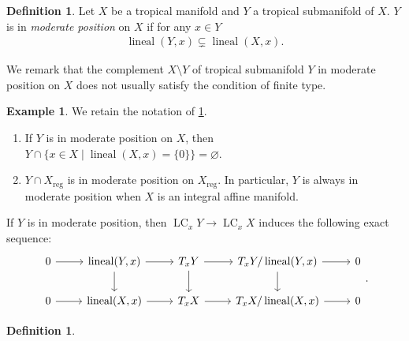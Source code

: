 \documentclass[a4paper,dvipdfmx,reqno,12pt]{amsart}
\theoremstyle{definition}
\newtheorem{definition}[theorem]{Definition}
\newtheorem{example}[theorem]{Example}
\newcommand{\opn}[1]{\operatorname{#1}}
\numberwithin{equation}{section}
\begin{document}
\begin{definition}
\label{definition-permissible-position}
Let $X$ be a tropical manifold and $Y$ a
tropical submanifold of $X$.
$Y$ is in \emph{moderate position} on $X$ if
for any $x\in Y$
\begin{align}
     \opn{lineal}(Y,x) \subsetneq
 \opn{lineal}(X,x).
\end{align}
\end{definition}
We remark that
the complement $X\setminus Y$ of tropical submanifold
$Y$ in moderate position on $X$
does not usually satisfy the condition of finite type. 
\begin{example}
We retain the notation of 
\cref{definition-permissible-position}.
\begin{enumerate}
\item If $Y$ is in moderate position on $X$, then
$Y\cap\{x\in X\mid \opn{lineal}(X,x)=\{0\}\}
=\varnothing$.
\item $Y\cap X_{\mathrm{reg}}$ is in 
moderate position on $X_{\mathrm{reg}}$.
In particular, $Y$ is always in moderate position
when $X$ is an integral affine manifold.
\end{enumerate}
\end{example}

If $Y$ is in moderate position, then 
$\opn{LC}_x Y\to \opn{LC}_x X$ induces the following 
exact sequence:
\[\begin{tikzcd}
	0 & {\opn{lineal}(Y,x)} & {T_x Y} & {T_x Y/\opn{lineal}(Y,x)} & 0 \\
	0 & {\opn{lineal}(X,x)} & {T_x X} & 
{T_x X/\opn{lineal}(X,x)} & 0
	\arrow[from=1-1, to=1-2]
	\arrow[from=2-1, to=2-2]
	\arrow[from=2-3, to=2-4]
	\arrow[from=1-3, to=1-4]
	\arrow[from=1-4, to=2-4]
	\arrow[from=1-2, to=2-2]
	\arrow[from=1-2, to=1-3]
	\arrow[from=2-2, to=2-3]
	\arrow[from=1-3, to=2-3]
	\arrow[from=2-4, to=2-5]
	\arrow[from=1-4, to=1-5]
\end{tikzcd}.\]

\begin{definition}
	
\end{definition}
\end{document}
